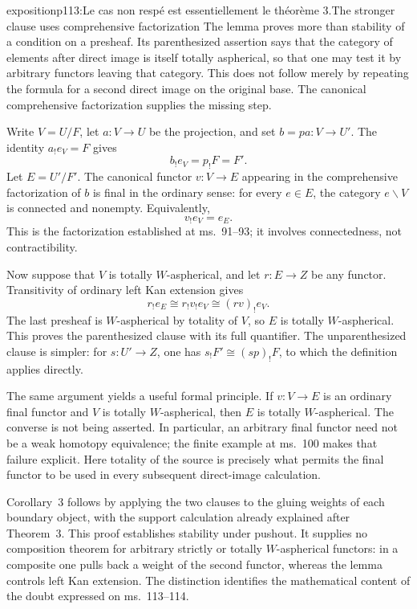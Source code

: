 \begin{dcomment}{exposition}{p113:Le cas non respé est essentiellement le théorème 3.}{The stronger clause uses comprehensive factorization}
The lemma proves more than stability of a condition on a presheaf. Its parenthesized assertion says that the category of elements after direct image is itself totally aspherical, so that one may test it by arbitrary functors leaving that category. This does not follow merely by repeating the formula for a second direct image on the original base. The canonical comprehensive factorization supplies the missing step.

Write $V=U/F$, let $a:V\to U$ be the projection, and set $b=pa:V\to U'$. The identity $a_!e_V=F$ gives
\[
 b_!e_V=p_!F=F'.
\]
Let $E=U'/F'$. The canonical functor $v:V\to E$ appearing in the comprehensive factorization of $b$ is final in the ordinary sense: for every $e\in E$, the category $e\backslash V$ is connected and nonempty. Equivalently,
\[
 v_!e_V=e_E.
\]
This is the factorization established at ms.~91--93; it involves connectedness, not contractibility.

Now suppose that $V$ is totally $W$-aspherical, and let $r:E\to Z$ be any functor. Transitivity of ordinary left Kan extension gives
\[
 r_!e_E\cong r_!v_!e_V\cong(rv)_!e_V.
\]
The last presheaf is $W$-aspherical by totality of $V$, so $E$ is totally $W$-aspherical. This proves the parenthesized clause with its full quantifier. The unparenthesized clause is simpler: for $s:U'\to Z$, one has $s_!F'\cong(sp)_!F$, to which the definition applies directly.

The same argument yields a useful formal principle. If $v:V\to E$ is an ordinary final functor and $V$ is totally $W$-aspherical, then $E$ is totally $W$-aspherical. The converse is not being asserted. In particular, an arbitrary final functor need not be a weak homotopy equivalence; the finite example at ms.~100 makes that failure explicit. Here totality of the source is precisely what permits the final functor to be used in every subsequent direct-image calculation.

Corollary~3 follows by applying the two clauses to the gluing weights of each boundary object, with the support calculation already explained after Theorem~3. This proof establishes stability under pushout. It supplies no composition theorem for arbitrary strictly or totally $W$-aspherical functors: in a composite one pulls back a weight of the second functor, whereas the lemma controls left Kan extension. The distinction identifies the mathematical content of the doubt expressed on ms.~113--114.
\end{dcomment}


